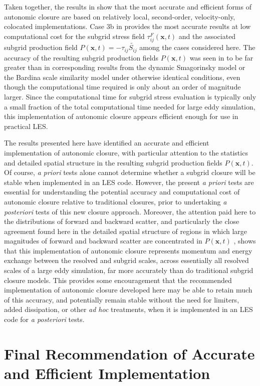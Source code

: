 Taken together, the results in  show that the most accurate and efficient forms of autonomic closure are based on relatively local, second-order, velocity-only, colocated implementations. Case 3b in  provides the most accurate results at low computational cost for the subgrid stress field $\tau_{ij}^F(\mathbf{x},t)$  and the associated subgrid production field $P(\mathbf{x},t) = -\tau_{ij}\widetilde{S_{ij}}$  among the cases considered here. The accuracy of the resulting subgrid production fields  $P(\mathbf{x},t)$ was seen in  to be far greater than in corresponding results from the dynamic Smagorinsky model or the Bardina scale similarity model under otherwise identical conditions, even though the computational time required is only about an order of magnitude larger. Since the computational time for subgrid stress evaluation is typically only a small fraction of the total computational time needed for large eddy simulation, this implementation of autonomic closure appears efficient enough for use in practical LES.

The results presented here have identified an accurate and efficient implementation of autonomic closure, with particular attention to the statistics and detailed spatial structure in the resulting subgrid production fields $P(\mathbf{x},t)$. Of course, \textit{a priori} tests alone cannot determine whether a subgrid closure will be stable when implemented in an LES code. However, the present \textit{a priori} tests are essential for understanding the potential accuracy and computational cost of autonomic closure relative to traditional closures, prior to undertaking \textit{a posteriori} tests of this new closure approach. Moreover, the attention paid here to the distributions of forward and backward scatter, and particularly the close agreement found here in the detailed spatial structure of regions in which large magnitudes of forward and backward scatter are concentrated in $P(\mathbf{x},t)$ , shows that this implementation of autonomic closure represents momentum and energy exchange between the resolved and subgrid scales, across essentially all resolved scales of a large eddy simulation, far more accurately than do traditional subgrid closure models. This provides some encouragement that the recommended implementation of autonomic closure developed here may be able to retain much of this accuracy, and potentially remain stable without the need for limiters, added dissipation, or other \textit{ad hoc} treatments, when it is implemented in an LES code for \textit{a posteriori} tests.

\section{Final Recommendation of Accurate and Efficient Implementation}

